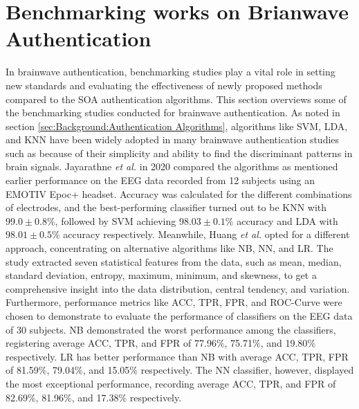 \section{Benchmarking works on Brianwave Authentication}
\label{sec:Related Work:Benchmarking works on Brianwave Authentication}
In brainwave authentication, benchmarking studies play a vital role in setting new standards and evaluating the effectiveness of newly proposed methods compared to the SOA authentication algorithms. This section overviews some of the benchmarking studies conducted for brainwave authentication. As noted in section \ref{sec:Background:Authentication Algorithms}, algorithms like SVM, LDA, and KNN have been widely adopted in many brainwave authentication studies such as \cite{kaur2017novel, jayarathne2016brainid, zuquete2010biometric} because of their simplicity and ability to find the discriminant patterns in brain signals. Jayarathne \textit{et al.} \cite{jayarathne2020person} in 2020 compared the algorithms as mentioned earlier performance on the EEG data recorded from 12 subjects using an EMOTIV Epoc+ headset. Accuracy was calculated for the different combinations of electrodes, and the best-performing classifier turned out to be KNN with $99.0 \pm 0.8\%$, followed by SVM achieving $98.03 \pm 0.1\%$ accuracy and LDA with $98.01 \pm 0.5\%$ accuracy respectively. Meanwhile, Huang \textit{et al.} \cite{huang2019eeg} opted for a different approach, concentrating on alternative algorithms like NB, NN, and LR. The study extracted seven statistical features from the data, such as mean, median, standard deviation, entropy, maximum, minimum, and skewness, to get a comprehensive insight into the data distribution, central tendency, and variation. 
Furthermore, performance metrics like ACC, TPR, FPR, and ROC-Curve were chosen to demonstrate to evaluate the performance of classifiers on the EEG data of 30 subjects. NB demonstrated the worst performance among the classifiers, registering average ACC, TPR, and FPR of 77.96$\%$, 75.71$\%$, and 19.80$\%$ respectively. LR has better performance than NB with average ACC, TPR, FPR of 81.59$\%$, 79.04$\%$, and 15.05$\%$ respectively. The NN classifier, however, displayed the most exceptional performance, recording average ACC, TPR, and FPR of 82.69$\%$, 81.96$\%$, and 17.38$\%$ respectively.


